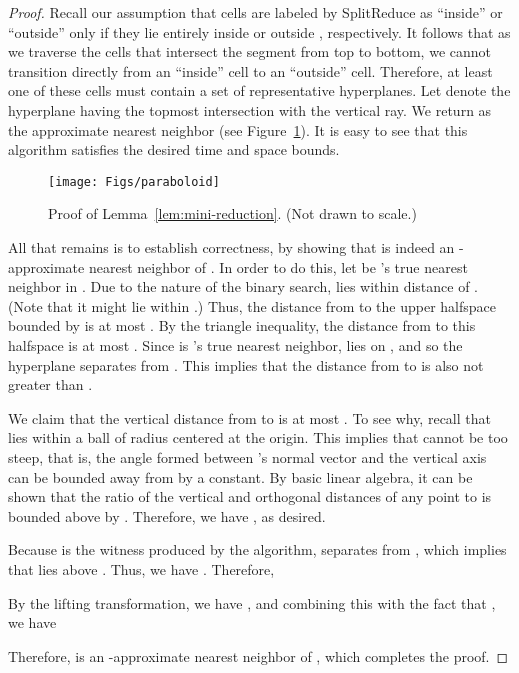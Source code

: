 \documentclass[11pt]{article}   \usepackage[letterpaper,hmargin=2.1cm,vmargin=3cm]{geometry}
\newcommand{\alg}{\textrm{SplitReduce}}
\begin{document}
\begin{proof}
Recall our assumption that cells are labeled by {\alg} as ``inside'' or ``outside'' only if they lie entirely inside or outside , respectively. It follows that as we traverse the cells that intersect the segment  from top to bottom, we cannot transition directly from an ``inside'' cell to an ``outside'' cell. Therefore, at least one of these cells must contain a set of representative hyperplanes. Let  denote the hyperplane having the topmost intersection with the vertical ray. We return  as the approximate nearest neighbor (see Figure~\ref{fig:paraboloid}). It is easy to see that this algorithm satisfies the desired time and space bounds. 

\begin{figure}[htbp]
  \centerline{\texttt{[image: Figs/paraboloid]}}
  \caption{Proof of Lemma~\ref{lem:mini-reduction}. (Not drawn to scale.)}
  \label{fig:paraboloid}
\end{figure}


All that remains is to establish correctness, by showing that  is indeed an -approximate nearest neighbor of . In order to do this, let  be 's true nearest neighbor in . Due to the nature of the binary search,  lies within distance  of . (Note that it might lie within .) Thus, the distance from  to the upper halfspace bounded by  is at most . By the triangle inequality, the distance from  to this halfspace is at most . Since  is 's true nearest neighbor,  lies on , and so the hyperplane  separates  from . This implies that the distance from  to  is also not greater than . 

We claim that the vertical distance from  to  is at most . To see why, recall that  lies within a ball of radius  centered at the origin. This implies that  cannot be too steep, that is, the angle formed between 's normal vector and the vertical axis can be bounded away from  by a constant. By basic linear algebra, it can be shown that the ratio of the vertical and orthogonal distances of any point to  is bounded above by . Therefore, we have , as desired. 

Because  is the witness produced by the algorithm,  separates  from , which implies that  lies above . Thus, we have . Therefore,

By the lifting transformation, we have , and combining this with the fact that , we have

Therefore,  is an -approximate nearest neighbor of , which completes the proof.
\end{proof}
\end{document}
